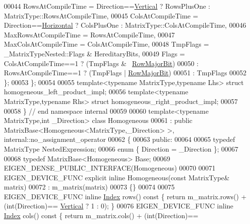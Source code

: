 \begin{DoxyCode}
00044     RowsAtCompileTime = Direction==\hyperlink{group__enums_ggad49a7b3738e273eb00932271b36127f7addca718e0564723df21d61b94b1198be}{Vertical}  ?  RowsPlusOne : MatrixType::RowsAtCompileTime,
00045     ColsAtCompileTime = Direction==\hyperlink{group__enums_ggad49a7b3738e273eb00932271b36127f7aae8a16b3b9272683c1162915f6d892be}{Horizontal} ? ColsPlusOne : MatrixType::ColsAtCompileTime,
00046     MaxRowsAtCompileTime = RowsAtCompileTime,
00047     MaxColsAtCompileTime = ColsAtCompileTime,
00048     TmpFlags = \_MatrixTypeNested::Flags & HereditaryBits,
00049     Flags = ColsAtCompileTime==1 ? (TmpFlags & ~\hyperlink{group__flags_gae4f56c2a60bbe4bd2e44c5b19cbe8762}{RowMajorBit})
00050           : RowsAtCompileTime==1 ? (TmpFlags | \hyperlink{group__flags_gae4f56c2a60bbe4bd2e44c5b19cbe8762}{RowMajorBit})
00051           : TmpFlags
00052   \};
00053 \};
00054 
00055 \textcolor{keyword}{template}<\textcolor{keyword}{typename} MatrixType,\textcolor{keyword}{typename} Lhs> \textcolor{keyword}{struct }homogeneous\_left\_product\_impl;
00056 \textcolor{keyword}{template}<\textcolor{keyword}{typename} MatrixType,\textcolor{keyword}{typename} Rhs> \textcolor{keyword}{struct }homogeneous\_right\_product\_impl;
00057 
00058 \} \textcolor{comment}{// end namespace internal}
00059 
00060 \textcolor{keyword}{template}<\textcolor{keyword}{typename} MatrixType,\textcolor{keywordtype}{int} \_Direction> \textcolor{keyword}{class }Homogeneous
00061   : \textcolor{keyword}{public} MatrixBase<Homogeneous<MatrixType,\_Direction> >, internal::no\_assignment\_operator
00062 \{
00063   \textcolor{keyword}{public}:
00064 
00065     \textcolor{keyword}{typedef} MatrixType NestedExpression;
00066     \textcolor{keyword}{enum} \{ Direction = \_Direction \};
00067 
00068     \textcolor{keyword}{typedef} MatrixBase<Homogeneous> Base;
00069     EIGEN\_DENSE\_PUBLIC\_INTERFACE(Homogeneous)
00070 
00071     EIGEN\_DEVICE\_FUNC \textcolor{keyword}{explicit} \textcolor{keyword}{inline} Homogeneous(\textcolor{keyword}{const} MatrixType& matrix)
00072       : m\_matrix(matrix)
00073     \{\}
00074 
00075     EIGEN\_DEVICE\_FUNC \textcolor{keyword}{inline} \hyperlink{namespace_eigen_a62e77e0933482dafde8fe197d9a2cfde}{Index} rows()\textcolor{keyword}{ const }\{ \textcolor{keywordflow}{return} m\_matrix.rows() + (int(Direction)==
      \hyperlink{group__enums_ggad49a7b3738e273eb00932271b36127f7addca718e0564723df21d61b94b1198be}{Vertical}   ? 1 : 0); \}
00076     EIGEN\_DEVICE\_FUNC \textcolor{keyword}{inline} \hyperlink{namespace_eigen_a62e77e0933482dafde8fe197d9a2cfde}{Index} cols()\textcolor{keyword}{ const }\{ \textcolor{keywordflow}{return} m\_matrix.cols() + (int(Direction)==

\end{DoxyCode}
